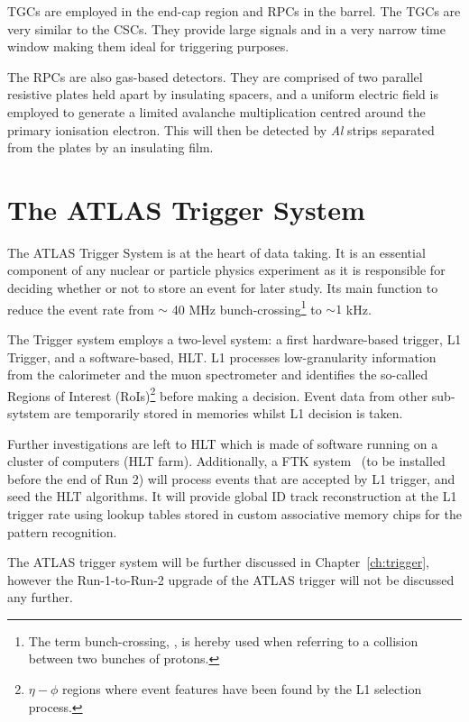 			\ac{TGCs} are employed in the end-cap region and \ac{RPCs} in the barrel. The \ac{TGCs} are very similar to the \ac{CSCs}. They provide large signals and in a very narrow time window making them ideal for triggering purposes.

			The \ac{RPCs} are also gas-based detectors. They are comprised of two parallel resistive plates held apart by insulating spacers, and a uniform electric field is employed to generate a limited avalanche multiplication centred around the primary ionisation electron. This will then be detected by \emph{Al} strips separated from the plates by an insulating film.




	\section{The ATLAS Trigger System}
	\label{sec:trigSyst}

		The \ac{ATLAS} Trigger System is at the heart of data taking. It is an essential component of any nuclear or particle physics experiment as it is responsible for deciding whether or not to store an event for later study. Its main function to reduce the event rate from $\sim$ 40 MHz bunch-crossing\footnote{The term bunch-crossing, \mubar, is hereby used when referring to a collision between two bunches of protons.} to $\sim 1$ kHz.

		The Trigger system employs a two-level system: a first hardware-based trigger, \ac{L1} Trigger, and a software-based, \ac{HLT}. \ac{L1} processes low-granularity information from the calorimeter and the muon spectrometer and identifies the so-called Regions of Interest (RoIs)\footnote{$\eta - \phi$ regions where event features have been found by the \ac{L1} selection process.} before making a decision. Event data from other sub-sytstem are temporarily stored in memories whilst \ac{L1} decision is taken.
		
		Further investigations are left to \ac{HLT} which is made of software running on a cluster of computers (\ac{HLT} farm). Additionally, a \ac{FTK} system~\cite{FTKTDR} (to be installed before the end of Run 2) will process events that are accepted by \ac{L1} trigger, and seed the \ac{HLT} algorithms. It will provide global \ac{ID} track reconstruction at the \ac{L1} trigger rate using lookup tables stored in custom associative memory chips for the pattern recognition.
		
		The \ac{ATLAS} trigger system will be further discussed in Chapter~\ref{ch:trigger}, however the Run-1-to-Run-2 upgrade of the \ac{ATLAS} trigger will not be discussed any further.